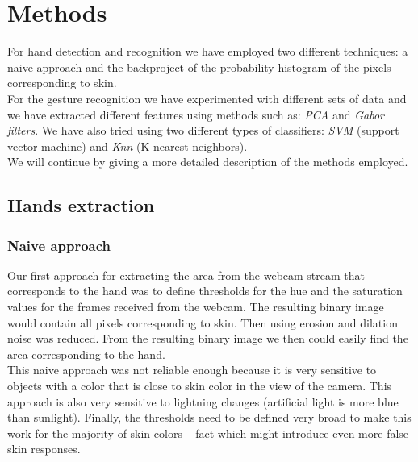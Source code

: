 \documentclass[a4paper, 11pt, twocolumn]{article}
\begin{document}
    \section{Methods}
	\label{sec:methods}
		For hand detection and recognition we have employed two different techniques: a naive approach and the backproject of the probability histogram of the pixels corresponding to skin.\\
		\hspace*{10px}For the gesture recognition we have experimented with different sets of data and we have extracted different features using methods such as: \emph{PCA} and \emph{Gabor filters}. We have also tried using two different types of classifiers: \emph{SVM} (support vector machine) and \emph{Knn} (K nearest neighbors).\\
		\hspace*{10px}We will continue by giving a more detailed description of the methods employed. 
        \subsection{Hands extraction}
		\label{sec:Meth_exrctHands}
        \subsubsection{Naive approach}
		 Our first approach for extracting the area from the webcam stream that corresponds to the hand was to define thresholds for the hue and the saturation values for the frames received from the webcam. The resulting binary image would contain all pixels corresponding to skin. Then using erosion and dilation noise was reduced. From the resulting binary image we then could easily find the area corresponding to the hand.\\
       	\hspace*{10px}This naive approach was not reliable enough because it is very sensitive to objects with a color that is close to skin color in the view of the camera. This approach is also very sensitive to lightning changes (artificial light is more blue than sunlight). Finally, the thresholds need to be defined very broad to make this work for the majority of skin colors -- fact which might introduce even more false skin responses.        
\end{document}
